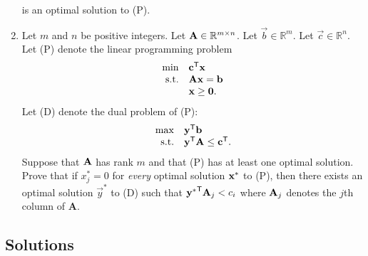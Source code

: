 \begin{enumerate}
  is an optimal solution to (P).
\item
  Let \(m\) and \(n\) be positive integers. Let
  \(\mathbf{A}\in \mathbb{R}^{m\times n}\). Let
  \(\vec{b}\in \mathbb{R}^{m}\). Let \(\vec{c}\in \mathbb{R}^{n}\). Let
  (P) denote the linear programming problem \[\begin{array}{rl}
  \min & \mathbf{c}^\mathsf{T} \mathbf{x} \\
  \mbox{s.t.} & \mathbf{A} \mathbf{x} = \mathbf{b} \\
  & \mathbf{x} \geq \mathbf{0}.
  \end{array}
  \] Let (D) denote the dual problem of (P): \[\begin{array}{rl}
  \max & \mathbf{y}^\mathsf{T} \mathbf{b} \\
  \mbox{s.t.} & \mathbf{y}^{\mathsf{T}} \mathbf{A} \leq
  \mathbf{c}^\mathsf{T}.
  \end{array}
  \] Suppose that \(\mathbf{A}\) has rank \(m\) and that (P) has at least
  one optimal solution. Prove that if \(x^*_j = 0\) for \emph{every}
  optimal solution \(\mathbf{x}^*\) to (P), then there exists an optimal
  solution \(\vec{y}^*\) to (D) such that
  \({\mathbf{y}^*}^{\mathsf{T}}\mathbf{A}_j < c_i\) where \(\mathbf{A}_j\) denotes the
  \(j\)th column of \(\mathbf{A}\).
\end{enumerate}

\subsection*{Solutions}\label{solutions-7}

